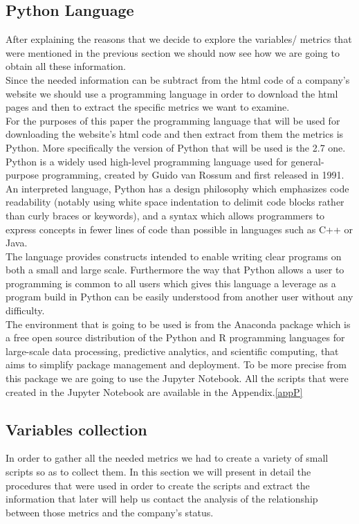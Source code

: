 \documentclass{article}
\begin{document}
\subsection{Python Language}
After explaining the reasons that we decide to explore the variables/ metrics that were mentioned in the previous section we should now see how we are going to obtain all these information.\\
Since the needed information can be subtract from the html code of a company's website we should use a programming language in order to download the html pages and then to extract the specific metrics we want to examine.\\
For the purposes of this paper the programming language that will be used for downloading the website's html code and then extract from them the metrics is Python. More specifically the version of Python that will be used is the 2.7 one.\cite{key43}\\
Python is a widely used high-level programming language used for general-purpose programming, created by Guido van Rossum and first released in 1991. An interpreted language, Python has a design philosophy which emphasizes code readability (notably using white space indentation to delimit code blocks rather than curly braces or keywords), and a syntax which allows programmers to express concepts in fewer lines of code than possible in languages such as C++ or Java. \\
The language provides constructs intended to enable writing clear programs on both a small and large scale. Furthermore the way that Python allows a user to programming is common to all users which gives this language a leverage as a program build in Python can be easily understood from another user without any difficulty.\\
The environment that is going to be used is from the Anaconda package which is a free open source distribution of the Python and R programming languages for large-scale data processing, predictive analytics, and scientific computing, that aims to simplify package management and deployment. To be more precise from this package we are going to use the Jupyter Notebook. All the scripts that were created in the Jupyter Notebook are available in the Appendix.\ref{appP}
\newpage
\subsection{Variables collection}
In order to gather all the needed metrics we had to create a variety of small scripts so as to collect them. In this section we will present in detail the procedures that were used in order to create the scripts and extract the information that later will help us contact the analysis of the relationship between those metrics and the company's status. 
\end{document}
